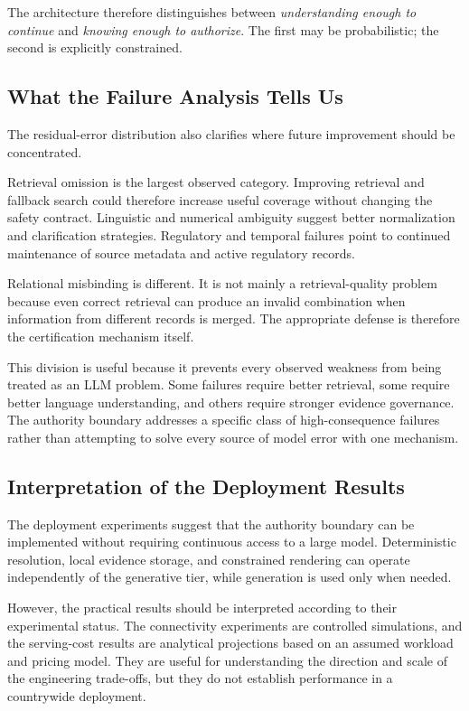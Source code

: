 \documentclass[a4paper,fleqn]{cas-dc}
\begin{document}
The architecture therefore distinguishes between \emph{understanding enough to continue} and \emph{knowing enough to authorize}. The first may be probabilistic; the second is explicitly constrained.

\subsection{What the Failure Analysis Tells Us}

The residual-error distribution also clarifies where future improvement should be concentrated.

Retrieval omission is the largest observed category. Improving retrieval and fallback search could therefore increase useful coverage without changing the safety contract. Linguistic and numerical ambiguity suggest better normalization and clarification strategies. Regulatory and temporal failures point to continued maintenance of source metadata and active regulatory records.

Relational misbinding is different. It is not mainly a retrieval-quality problem because even correct retrieval can produce an invalid combination when information from different records is merged. The appropriate defense is therefore the certification mechanism itself.

This division is useful because it prevents every observed weakness from being treated as an LLM problem. Some failures require better retrieval, some require better language understanding, and others require stronger evidence governance. The authority boundary addresses a specific class of high-consequence failures rather than attempting to solve every source of model error with one mechanism.

\subsection{Interpretation of the Deployment Results}

The deployment experiments suggest that the authority boundary can be implemented without requiring continuous access to a large model. Deterministic resolution, local evidence storage, and constrained rendering can operate independently of the generative tier, while generation is used only when needed.

However, the practical results should be interpreted according to their experimental status. The connectivity experiments are controlled simulations, and the serving-cost results are analytical projections based on an assumed workload and pricing model. They are useful for understanding the direction and scale of the engineering trade-offs, but they do not establish performance in a countrywide deployment. 
\end{document}
